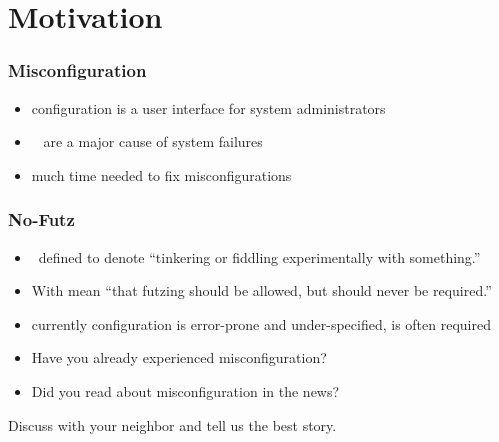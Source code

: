 \documentclass{beamer}
\begin{document}
\section{Motivation}
{
%
\begin{frame}
	\frametitle{Misconfiguration}
	\begin{itemize}
		\item configuration is a user interface for system administrators
		\item {}~\cite{yin2011empirical,su2007autobash,attariyan2010automating,xu2015systems}
			are a major cause of system failures~\cite{wool2004quantitative,oppenheimer2003internet,pertet2005causes}
		\item much time needed to fix misconfigurations~\cite{rabkin2011static,oppenheimer2003internet,yin2011empirical,mahajan2002bgp}
	\end{itemize}
\end{frame}
\begin{frame}
	\frametitle{No-Futz}
	\begin{itemize}
		\item \citet{holland2001nofutz}~defined  to denote \enquote{tinkering or fiddling experimentally with something.}
		\item With  \citet{holland2001nofutz} mean \enquote{that futzing should be allowed, but should never be required.}
		\item currently configuration is error-prone and under-specified,  is often required
	\end{itemize}
\end{frame}
}
\begin{assignment}
	\begin{itemize}
		\item Have you already experienced misconfiguration?
		\item Did you read about misconfiguration in the news?
	\end{itemize}
	\begin{task}
	Discuss with your neighbor and tell us the best story.
	\end{task}
\end{assignment}

\begin{frame}
	\tableofcontents
\end{frame}
\end{document}
